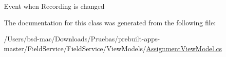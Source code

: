 Event when Recording is changed 



The documentation for this class was generated from the following file\+:\begin{DoxyCompactItemize}
\item 
/\+Users/bsd-\/mac/\+Downloads/\+Pruebas/prebuilt-\/apps-\/master/\+Field\+Service/\+Field\+Service/\+View\+Models/\hyperlink{_view_models_2_assignment_view_model_8cs}{Assignment\+View\+Model.\+cs}\end{DoxyCompactItemize}
